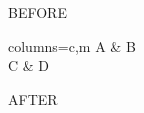 \documentclass{article}
\begin{document}
BEFORE

\begin{tblr}{columns={c,m}}
A & B \\
C & D \\
\end{tblr}

AFTER
\end{document}

